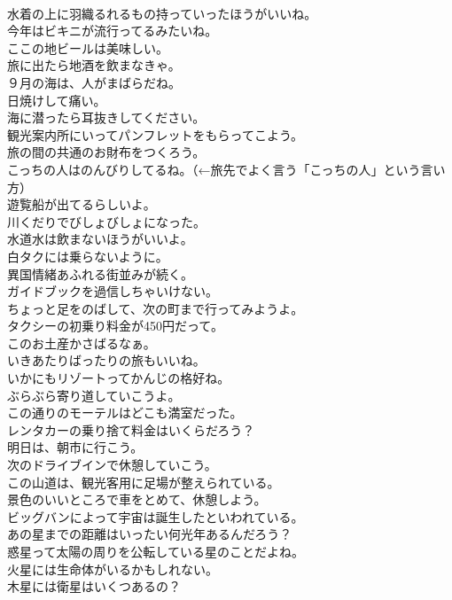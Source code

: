 \documentclass[8pt]{extreport}
\begin{document}
\begin{CJK}{UTF8}{min}
\\	水着の上に羽織るれるもの持っていったほうがいいね。	
\\	今年はビキニが流行ってるみたいね。	
\\	ここの地ビールは美味しい。	
\\	旅に出たら地酒を飲まなきゃ。	
\\	９月の海は、人がまばらだね。	
\\	日焼けして痛い。	
\\	海に潜ったら耳抜きしてください。	
\\	観光案内所にいってパンフレットをもらってこよう。	
\\	旅の間の共通のお財布をつくろう。	
\\	こっちの人はのんびりしてるね。（←旅先でよく言う「こっちの人」という言い方）	
\\	遊覧船が出てるらしいよ。	
\\	川くだりでびしょびしょになった。	
\\	水道水は飲まないほうがいいよ。	
\\	白タクには乗らないように。	
\\	異国情緒あふれる街並みが続く。	
\\	ガイドブックを過信しちゃいけない。	
\\	ちょっと足をのばして、次の町まで行ってみようよ。	
\\	タクシーの初乗り料金が450円だって。	
\\	このお土産かさばるなぁ。	
\\	いきあたりばったりの旅もいいね。	
\\	いかにもリゾートってかんじの格好ね。	
\\	ぶらぶら寄り道していこうよ。	
\\	この通りのモーテルはどこも満室だった。	
\\	レンタカーの乗り捨て料金はいくらだろう？	
\\	明日は、朝市に行こう。	
\\	次のドライブインで休憩していこう。	
\\	この山道は、観光客用に足場が整えられている。	
\\	景色のいいところで車をとめて、休憩しよう。	
\\	ビッグバンによって宇宙は誕生したといわれている。	
\\	あの星までの距離はいったい何光年あるんだろう？	
\\	惑星って太陽の周りを公転している星のことだよね。	
\\	火星には生命体がいるかもしれない。	
\\	木星には衛星はいくつあるの？	

\end{CJK}
\end{document}
